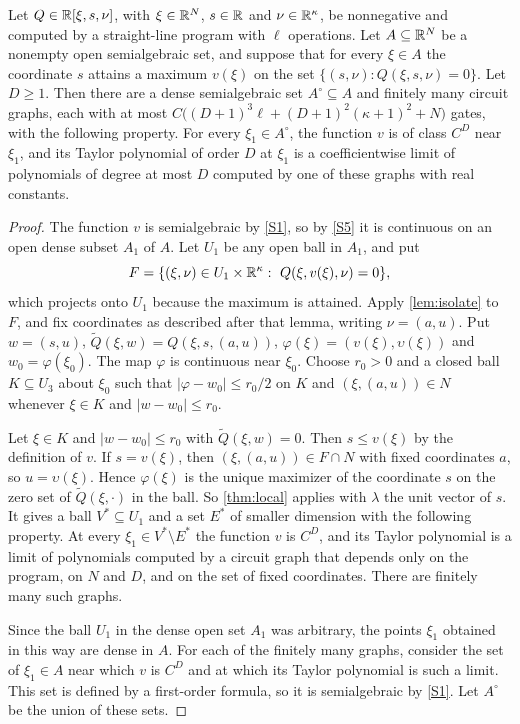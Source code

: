 \begin{proposition}\label{prop:value}
Let $Q\in\mathbb{R}[\xi,s,\nu]$, with $\xi\in\mathbb{R}^N$, $s\in\mathbb{R}$ and $\nu\in\mathbb{R}^\kappa$, be nonnegative and computed by a straight-line program with $\ell$ operations. Let $A\subseteq\mathbb{R}^N$ be a nonempty open semialgebraic set, and suppose that for every $\xi\in A$ the coordinate $s$ attains a maximum $v(\xi)$ on the set $\{(s,\nu):Q(\xi,s,\nu)=0\}$. Let $D\ge1$. Then there are a dense semialgebraic set $A^\circ\subseteq A$ and finitely many circuit graphs, each with at most $C\bigl((D+1)^3\ell+(D+1)^2(\kappa+1)^2+N\bigr)$ gates, with the following property. For every $\xi_1\in A^\circ$, the function $v$ is of class $C^D$ near $\xi_1$, and its Taylor polynomial of order $D$ at $\xi_1$ is a coefficientwise limit of polynomials of degree at most $D$ computed by one of these graphs with real constants.
\end{proposition}

\begin{proof}
The function $v$ is semialgebraic by \ref{S1}, so by \ref{S5} it is continuous on an open dense subset $A_1$ of $A$. Let $U_1$ be any open ball in $A_1$, and put
\[
F=\{(\xi,\nu)\in U_1\times\mathbb{R}^\kappa:\ Q(\xi,v(\xi),\nu)=0\},
\]
which projects onto $U_1$ because the maximum is attained. Apply \cref{lem:isolate} to $F$, and fix coordinates as described after that lemma, writing $\nu=(a,u)$. Put $w=(s,u)$, $\tilde Q(\xi,w)=Q(\xi,s,(a,u))$, $\varphi(\xi)=(v(\xi),\upsilon(\xi))$ and $w_0=\varphi(\xi_0)$. The map $\varphi$ is continuous near $\xi_0$. Choose $r_0>0$ and a closed ball $K\subseteq U_3$ about $\xi_0$ such that $|\varphi-w_0|\le r_0/2$ on $K$ and $(\xi,(a,u))\in N$ whenever $\xi\in K$ and $|w-w_0|\le r_0$.

Let $\xi\in K$ and $|w-w_0|\le r_0$ with $\tilde Q(\xi,w)=0$. Then $s\le v(\xi)$ by the definition of $v$. If $s=v(\xi)$, then $(\xi,(a,u))\in F\cap N$ with fixed coordinates $a$, so $u=\upsilon(\xi)$. Hence $\varphi(\xi)$ is the unique maximizer of the coordinate $s$ on the zero set of $\tilde Q(\xi,\cdot)$ in the ball. So \cref{thm:local} applies with $\lambda$ the unit vector of $s$. It gives a ball $V^*\subseteq U_1$ and a set $E^*$ of smaller dimension with the following property. At every $\xi_1\in V^*\setminus E^*$ the function $v$ is $C^D$, and its Taylor polynomial is a limit of polynomials computed by a circuit graph that depends only on the program, on $N$ and $D$, and on the set of fixed coordinates. There are finitely many such graphs.

Since the ball $U_1$ in the dense open set $A_1$ was arbitrary, the points $\xi_1$ obtained in this way are dense in $A$. For each of the finitely many graphs, consider the set of $\xi_1\in A$ near which $v$ is $C^D$ and at which its Taylor polynomial is such a limit. This set is defined by a first-order formula, so it is semialgebraic by \ref{S1}. Let $A^\circ$ be the union of these sets.
\end{proof}

